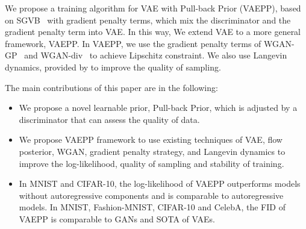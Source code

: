 We propose a training algorithm for VAE with Pull-back Prior (VAEPP), based on SGVB~\cite{kingma2014auto} with gradient penalty terms, which mix the discriminator and the gradient penalty term into VAE. In this way, We extend VAE to a more general framework, VAEPP. In VAEPP, we use the gradient penalty terms of WGAN-GP~\cite{gulrajani2017improved} and WGAN-div~\cite{wu2018wasserstein} to achieve Lipschitz constraint. We also use Langevin dynamics, provided by \cite{kumar2019maximum} to improve the quality of sampling. 

The main contributions of this paper are in the following:
\begin{itemize}
	\item We propose a novel learnable prior, Pull-back Prior, which is adjusted by a discriminator that can assess the quality of data. 
	\item We propose VAEPP framework to use existing techniques of VAE, \EG flow posterior, WGAN, \EG gradient penalty strategy, and Langevin dynamics to improve the log-likelihood, quality of sampling and stability of training. 
	\item In MNIST and CIFAR-10, the log-likelihood of VAEPP outperforms models without autoregressive components and is comparable to autoregressive models. In MNIST, Fashion-MNIST, CIFAR-10 and CelebA,  the FID of VAEPP is comparable to GANs and SOTA of VAEs. 
\end{itemize}
